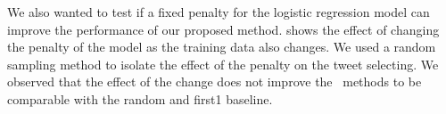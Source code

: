 We also wanted to test if a fixed penalty for the logistic regression model can improve the performance of our proposed method.  shows the effect of changing the penalty of the model as the training data also changes. We used a random sampling method to isolate the effect of the penalty on the tweet selecting. We observed that the effect of the change does not improve the \SR\ methods to be comparable with the random and first1 baseline. 